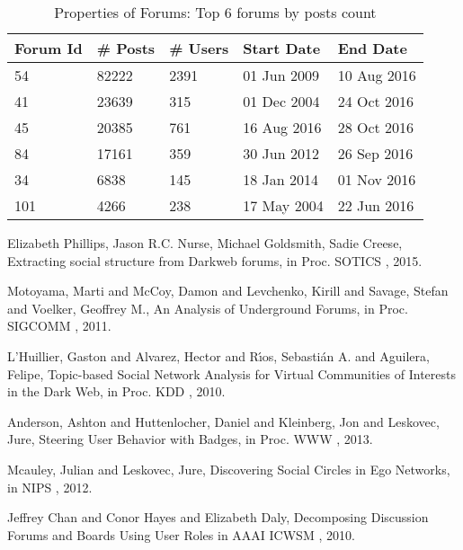 \documentclass[smallextended]{svjour3}       %
\theoremstyle{definition}
\begin{document}
	\begin{table}[!h]
		\centering
		\renewcommand{\arraystretch}{1}
		\caption{Properties of Forums: Top 6 forums by posts count}
		\begin{tabular}{|p{1cm}|p{2cm}|p{2cm}|p{2cm}|p{2cm}|}
			\hline 
			{\bf Forum Id} & {\bf \# Posts} & {\bf \# Users} 
			&{\bf Start Date} & {\bf End Date} \\ 
			\hline\hline
			     54      & 82222 & 2391 & 01 Jun 2009 & 10 Aug 2016\\
			\hline
			41 & 23639 & 315 & 01 Dec 2004 & 24 Oct 2016\\
			\hline 
			45 & 20385 & 761 & 16 Aug 2016 & 28 Oct 2016    \\       
			 \hline 
			84 & 17161 & 359 & 30 Jun 2012 & 26  Sep 2016\\
			\hline
			34 & 6838 & 145 & 18 Jan 2014 & 01 Nov 2016\\
			\hline
			101 & 4266 & 238 & 17 May 2004 & 22 Jun 2016\\
			\hline			
		\end{tabular}
		\label{tab:table2}
	\end{table}

\begin{thebibliography}{}
	{Elizabeth Phillips, Jason R.C. Nurse, Michael Goldsmith, Sadie Creese},
	Extracting social structure from Darkweb forums,
	in Proc. SOTICS ,
	{2015.}
	
	{Motoyama, Marti and McCoy, Damon and Levchenko, Kirill and Savage, Stefan and Voelker, Geoffrey M.},
	An Analysis of Underground Forums,
	in Proc. SIGCOMM ,
	{2011.}
	
	{L'Huillier, Gaston and Alvarez, Hector and R\'{\i}os, Sebasti\'{a}n A. and Aguilera, Felipe},
		Topic-based Social Network Analysis for Virtual Communities of Interests in the Dark Web,
		in Proc. KDD ,
		{2010.}
	
	{Anderson, Ashton and Huttenlocher, Daniel and Kleinberg, Jon and Leskovec, Jure},
	Steering User Behavior with Badges,
	in Proc. WWW ,
	{2013.}
	
	{Mcauley, Julian and Leskovec, Jure},
	Discovering Social Circles in Ego Networks,
	in NIPS ,
	{2012.}
	
	{Jeffrey Chan and Conor Hayes and Elizabeth Daly},
	Decomposing Discussion Forums and Boards Using User Roles
	in AAAI ICWSM ,
	{2010.}
		
\end{thebibliography}
\end{document}
